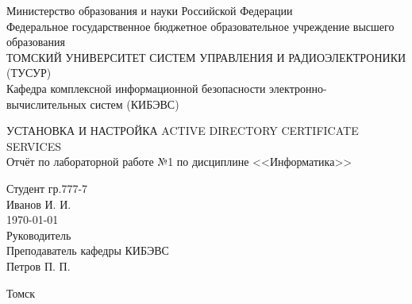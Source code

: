 \begin{titlepage}
    \newpage

    \begin{center}
        Министерство образования и науки Российской
        Федерации\\
        \vspace{1em}
        Федеральное государственное бюджетное образовательное учреждение высшего  образования\\
        \vspace{1em}
        \MakeTextUppercase{Томский Университет Систем Управления и
        Радиоэлектроники (ТУСУР)}\\
        \vspace{1em}
        Кафедра комплексной информационной безопасности
        электронно-вычислительных систем (КИБЭВС)
    \end{center}

    \vspace{11em}

    \begin{center}
        \MakeTextUppercase{Установка и настройка Active Directory Certificate Services}\\
        \vspace{1em}
        Отчёт по лабораторной работе №1 по дисциплине <<Информатика>>\\
    \end{center}

    \vspace{8em}

    \begin{flushright}
        \begin{minipage}[t]{0.4\textwidth}
            \begin{flushleft}
                Студент гр.777-7\\
                \underline{\phantom{aaaaaaaaaaaaaaa}} Иванов И. И.\\
                \today\\
                \vspace{2em}
                Руководитель\\
                Преподаватель кафедры КИБЭВС\\
                \underline{\phantom{aaaaaaaaaaaaaaa}} Петров П. П.\\
                \underline{\phantom{aaaaaaaaaaaaaaa}}
            \end{flushleft}
        \end{minipage}
    \end{flushright}

    \vfill

    \begin{center}
        Томск \the\year
    \end{center}

\end{titlepage}
\clearpage
